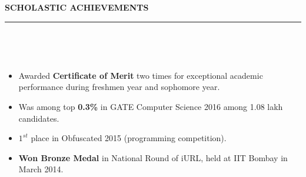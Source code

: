 \documentclass[a4paper,10pt]{article}
\newcommand{\isep}{-2 pt}
\newcommand{\lsep}{-0.5cm}
\newcommand{\resheading}[1]{{\small
        {
            \begin{minipage}
                {0.975\textwidth}\textbf{{\textsc{#1 \vphantom{p\^{E}} }}}
                \\[-0.3cm]
                \hrule
            \end{minipage}
            \\[-0.5cm]
        }
 }}
\begin{document}
\resheading{\textbf{\large SCHOLASTIC ACHIEVEMENTS}}\\[\lsep]
\begin{itemize}\itemsep \isep
    \item Awarded \textbf{Certificate of Merit} two times for exceptional academic performance during freshmen year and sophomore year.
    \item Was among top \textbf{0.3\%} in GATE Computer Science 2016 among 1.08 lakh candidates.
    \item \textbf{$1^{st}$} place in Obfuscated 2015 (programming competition).
    \item \textbf{Won Bronze Medal} in National Round of iURL, held at IIT Bombay in March 2014.
\end{itemize}
\end{document}
